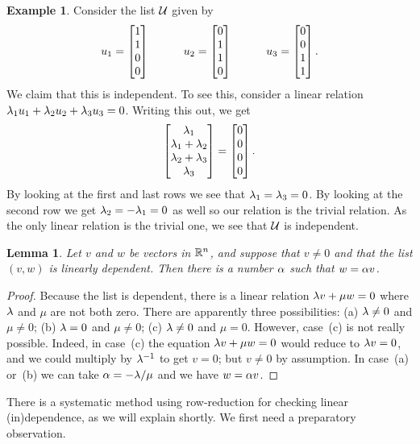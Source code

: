\documentclass[reqno]{amsart}
\newtheorem{lemma}[theorem]{Lemma}
\theoremstyle{definition}
\newtheorem{example}[theorem]{Example}
\begin{document}
\begin{example}\label{eg-indep-i}
 Consider the list $\mathcal{U}$ given by
 \[ u_1 = \left[\begin{matrix} 1 \\ 1 \\ 0 \\ 0 \end{matrix}\right] \hspace{3em}
    u_2 = \left[\begin{matrix} 0 \\ 1 \\ 1 \\ 0 \end{matrix}\right] \hspace{3em}
    u_3 = \left[\begin{matrix} 0 \\ 0 \\ 1 \\ 1 \end{matrix}\right].
 \]
 We claim that this is independent.  To see this, consider a linear
 relation $\lambda_1u_1+\lambda_2u_2+\lambda_3u_3=0$.  Writing this out, we get
 \[ \left[\begin{matrix} \lambda_1 \\ \lambda_1+\lambda_2 \\ \lambda_2+\lambda_3 \\ \lambda_3 \end{matrix}\right] =
    \left[\begin{matrix} 0 \\ 0 \\ 0 \\ 0 \end{matrix}\right].
 \]
 By looking at the first and last rows we see that $\lambda_1=\lambda_3=0$.
 By looking at the second row we get $\lambda_2=-\lambda_1=0$ as well so our
 relation is the trivial relation.  As the only linear relation is the
 trivial one, we see that $\mathcal{U}$ is independent.
\end{example}

\begin{lemma}\label{lem-multiples}
 Let $v$ and $w$ be vectors in ${\mathbb{R}}^n$, and suppose that $v\neq 0$ and
 that the list $(v,w)$ is linearly dependent.  Then there is a number
 $\alpha$ such that $w=\alpha v$.
\end{lemma}
\begin{proof}
 Because the list is dependent, there is a linear relation
 $\lambda v+\mu w=0$ where $\lambda$ and $\mu$ are not both zero.  There are
 apparently three possibilities: (a) $\lambda\neq 0$ and $\mu\neq 0$; (b)
 $\lambda=0$ and $\mu\neq 0$; (c) $\lambda\neq 0$ and $\mu=0$.  However,
 case~(c) is not really possible.  Indeed, in case~(c) the equation
 $\lambda v+\mu w=0$ would reduce to $\lambda v=0$, and we could multiply by
 $\lambda^{-1}$ to get $v=0$; but $v\neq 0$ by assumption.  In case~(a)
 or~(b) we can take $\alpha=-\lambda/\mu$ and we have $w=\alpha v$.
\end{proof}

There is a systematic method using row-reduction for checking linear
(in)dependence, as we will explain shortly.  We first need a
preparatory observation.
\end{document}
